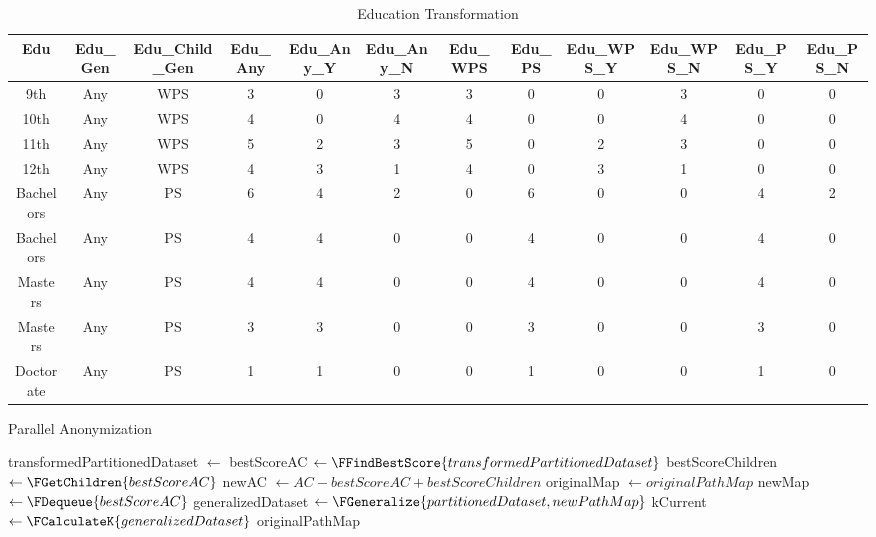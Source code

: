 \documentclass[11pt]{article}       %
\begin{document}
\begin{table}[h]
\begin{adjustbox}{width=\textwidth, center}
\begin{tabular}{|c|c|c|c|c|c|c|c|c|c|c|c|}
\hline
Edu & Edu\_Gen & Edu\_Child\_Gen & Edu\_Any & Edu\_Any\_Y & Edu\_Any\_N & Edu\_WPS & Edu\_PS & Edu\_WPS\_Y & Edu\_WPS\_N & Edu\_PS\_Y & Edu\_PS\_N\\
\hline
9th & Any & WPS & 3 & 0 & 3 & 3 & 0 & 0 & 3 & 0 & 0\\
10th & Any & WPS & 4 & 0 & 4 & 4 & 0 & 0 & 4 & 0 & 0\\
11th & Any & WPS & 5 & 2 & 3 & 5 & 0 & 2 & 3 & 0 & 0\\
12th & Any & WPS & 4 & 3 & 1 & 4 & 0 & 3 & 1 & 0 & 0\\
Bachelors & Any & PS & 6 & 4 & 2 & 0 & 6 & 0 & 0 & 4 & 2\\
Bachelors & Any & PS & 4 & 4 & 0 & 0 & 4 & 0 & 0 & 4 & 0\\
Masters & Any & PS & 4 & 4 & 0 & 0 & 4 & 0 & 0 & 4 & 0\\
Masters & Any & PS & 3 & 3 & 0 & 0 & 3 & 0 & 0 & 3 & 0\\
Doctorate & Any & PS & 1 & 1 & 0 & 0 & 1 & 0 & 0 & 1 & 0\\
\hline
\end{tabular}
\end{adjustbox}
\caption{Education Transformation}
\label{table3}
\end{table}

\begin{algorithm}[htp]
\label{tdsImplemented}
\caption{Parallel Anonymization}

 {
  transformedPartitionedDataset $\leftarrow$ \;
  bestScoreAC $\leftarrow \FFindBestScore{transformedPartitionedDataset}$\;
  bestScoreChildren $\leftarrow \FGetChildren{bestScoreAC}$\;
  newAC $\leftarrow AC - bestScoreAC + bestScoreChildren$\;
  originalMap $\leftarrow originalPathMap$\;
  newMap $\leftarrow \FDequeue{bestScoreAC}$\;
  generalizedDataset $\leftarrow \FGeneralize{partitionedDataset, newPathMap}$\;
  kCurrent $\leftarrow \FCalculateK{generalizedDataset}$\;
   {
    \KwRet {}
  }
   {
    \KwRet originalPathMap\; 
  }
}

\end{algorithm}
\end{document}
